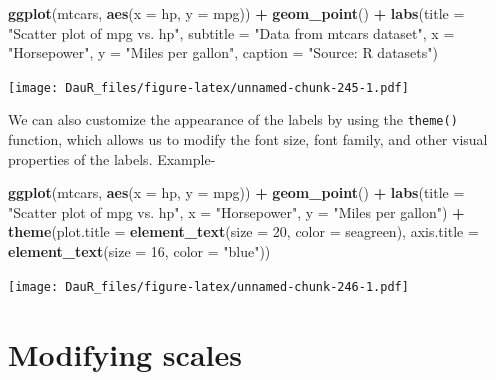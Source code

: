 \documentclass[
]{book}
\newenvironment{Shaded}{\begin{snugshade}}{\end{snugshade}}
\newcommand{\AttributeTok}[1]{\textcolor[rgb]{0.13,0.29,0.53}{#1}}
\newcommand{\DecValTok}[1]{\textcolor[rgb]{0.00,0.00,0.81}{#1}}
\newcommand{\FunctionTok}[1]{\textcolor[rgb]{0.13,0.29,0.53}{\textbf{#1}}}
\newcommand{\NormalTok}[1]{#1}
\newcommand{\SpecialCharTok}[1]{\textcolor[rgb]{0.81,0.36,0.00}{\textbf{#1}}}
\newcommand{\StringTok}[1]{\textcolor[rgb]{0.31,0.60,0.02}{#1}}
\begin{document}
\begin{Shaded}
\begin{Highlighting}[]
\FunctionTok{ggplot}\NormalTok{(mtcars, }\FunctionTok{aes}\NormalTok{(}\AttributeTok{x =}\NormalTok{ hp, }\AttributeTok{y =}\NormalTok{ mpg)) }\SpecialCharTok{+}
  \FunctionTok{geom\_point}\NormalTok{() }\SpecialCharTok{+}
  \FunctionTok{labs}\NormalTok{(}\AttributeTok{title =} \StringTok{"Scatter plot of mpg vs. hp"}\NormalTok{,}
       \AttributeTok{subtitle =} \StringTok{"Data from mtcars dataset"}\NormalTok{,}
       \AttributeTok{x =} \StringTok{"Horsepower"}\NormalTok{,}
       \AttributeTok{y =} \StringTok{"Miles per gallon"}\NormalTok{,}
       \AttributeTok{caption =} \StringTok{"Source: R datasets"}\NormalTok{)}
\end{Highlighting}
\end{Shaded}

\texttt{[image: DauR\_files/figure-latex/unnamed-chunk-245-1.pdf]}

We can also customize the appearance of the labels by using the \texttt{theme()} function, which allows us to modify the font size, font family, and other visual properties of the labels. Example-

\begin{Shaded}
\begin{Highlighting}[]
\FunctionTok{ggplot}\NormalTok{(mtcars, }\FunctionTok{aes}\NormalTok{(}\AttributeTok{x =}\NormalTok{ hp, }\AttributeTok{y =}\NormalTok{ mpg)) }\SpecialCharTok{+}
  \FunctionTok{geom\_point}\NormalTok{() }\SpecialCharTok{+}
  \FunctionTok{labs}\NormalTok{(}\AttributeTok{title =} \StringTok{"Scatter plot of mpg vs. hp"}\NormalTok{,}
       \AttributeTok{x =} \StringTok{"Horsepower"}\NormalTok{,}
       \AttributeTok{y =} \StringTok{"Miles per gallon"}\NormalTok{) }\SpecialCharTok{+}
  \FunctionTok{theme}\NormalTok{(}\AttributeTok{plot.title =} \FunctionTok{element\_text}\NormalTok{(}\AttributeTok{size =} \DecValTok{20}\NormalTok{, }\AttributeTok{color =} \StringTok{\textquotesingle{}seagreen\textquotesingle{}}\NormalTok{),}
        \AttributeTok{axis.title =} \FunctionTok{element\_text}\NormalTok{(}\AttributeTok{size =} \DecValTok{16}\NormalTok{, }\AttributeTok{color =} \StringTok{"blue"}\NormalTok{))}
\end{Highlighting}
\end{Shaded}

\texttt{[image: DauR\_files/figure-latex/unnamed-chunk-246-1.pdf]}

\hypertarget{modifying-scales}{%
\section{Modifying scales}\label{modifying-scales}}
\end{document}
